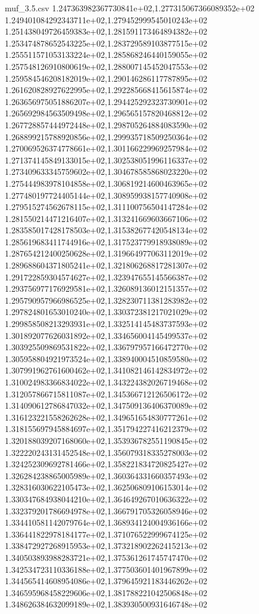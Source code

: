 \begin{filecontents*}{muf_3.5.csv}
1.247363982367730841e+02,1.277315067366089352e+02
1.249401084292343711e+02,1.279452999545010243e+02
1.251438049726459383e+02,1.281591173464894382e+02
1.253474878652543225e+02,1.283729589103877515e+02
1.255511571053133224e+02,1.285868246440159055e+02
1.257548126910800619e+02,1.288007145452047553e+02
1.259584546208182019e+02,1.290146286117787895e+02
1.261620828927622995e+02,1.292285668415615874e+02
1.263656975051886207e+02,1.294425292323730901e+02
1.265692984563509498e+02,1.296565157820468812e+02
1.267728857444972448e+02,1.298705264884083590e+02
1.268899215788920856e+02,1.299935718509250364e+02
1.270069526374778661e+02,1.301166229969257984e+02
1.271374145849133015e+02,1.302538051996116337e+02
1.273409633345759602e+02,1.304678585868023220e+02
1.275444983978104858e+02,1.306819214600463965e+02
1.277480197724405144e+02,1.308959938157740908e+02
1.279515274562678115e+02,1.311100756504147284e+02
1.281550214471216407e+02,1.313241669603667106e+02
1.283585017428178503e+02,1.315382677420548134e+02
1.285619683411744916e+02,1.317523779918938089e+02
1.287654212400250628e+02,1.319664977063112019e+02
1.289688604371805241e+02,1.321806268817281307e+02
1.291722859304574627e+02,1.323947655145566387e+02
1.293756977176929581e+02,1.326089136012151357e+02
1.295790957966986525e+02,1.328230711381283982e+02
1.297824801653010240e+02,1.330372381217021029e+02
1.299858508213293931e+02,1.332514145483737593e+02
1.301892077626031892e+02,1.334656004145499537e+02
1.303925509869531822e+02,1.336797957166472770e+02
1.305958804921973524e+02,1.338940004510859580e+02
1.307991962761600462e+02,1.341082146142834972e+02
1.310024983366834022e+02,1.343224382026719468e+02
1.312057866715811087e+02,1.345366712126506172e+02
1.314090612786847032e+02,1.347509136406370089e+02
1.316123221558262628e+02,1.349651654830777261e+02
1.318155697945884697e+02,1.351794227416212379e+02
1.320188039207168060e+02,1.353936782551190845e+02
1.322220243131452548e+02,1.356079318335278003e+02
1.324252309692781466e+02,1.358221834720825427e+02
1.326284238865005989e+02,1.360364331660357493e+02
1.328316030622105473e+02,1.362506809106153014e+02
1.330347684938044210e+02,1.364649267010636322e+02
1.332379201786694978e+02,1.366791705326058946e+02
1.334410581142079764e+02,1.368934124004936166e+02
1.336441822978184177e+02,1.371076522999674125e+02
1.338472927268915953e+02,1.373218902262415213e+02
1.340503893988283721e+02,1.375361261745747470e+02
1.342534723110336188e+02,1.377503601401967899e+02
1.344565414608954086e+02,1.379645921183446262e+02
1.346595968458229606e+02,1.381788221042506848e+02
1.348626384632099189e+02,1.383930500931646748e+02

\end{filecontents*}
